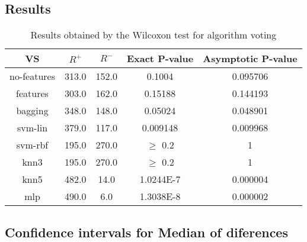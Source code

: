 \documentclass[a4paper,10pt]{article}
\begin{document}
\subsection{Results}

\begin{table}[!htp]
\centering\small
\begin{tabular}{
|c|c|c|c|c|}
\hline
 VS & $R^{+}$ & $R^{-}$ & Exact P-value & Asymptotic P-value \\ \hline 
no-features & 313.0 & 152.0 & 0.1004 & 0.095706\\ \hline 
features & 303.0 & 162.0 & 0.15188 & 0.144193\\ \hline 
bagging & 348.0 & 148.0 & 0.05024 & 0.048901\\ \hline 
svm-lin & 379.0 & 117.0 & 0.009148 & 0.009968\\ \hline 
svm-rbf & 195.0 & 270.0 & $\geq$ 0.2 & 1\\ \hline 
knn3 & 195.0 & 270.0 & $\geq$ 0.2 & 1\\ \hline 
knn5 & 482.0 & 14.0 & 1.0244E-7 & 0.000004\\ \hline 
mlp & 490.0 & 6.0 & 1.3038E-8 & 0.000002\\ \hline 

\end{tabular}
\caption{Results obtained by the Wilcoxon test for algorithm voting}
\end{table}

\subsection{Confidence intervals for Median of diferences}
\end{document}
